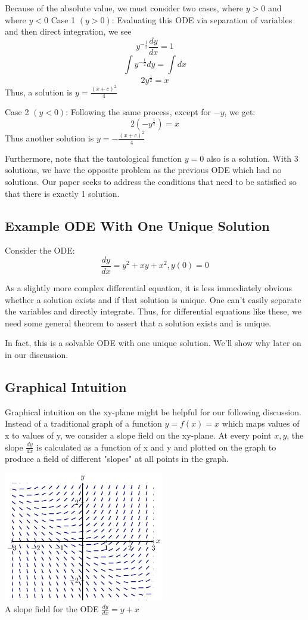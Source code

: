 \documentclass{article}
\begin{document}
Because of the absolute value, we must consider two cases, where $y>0$ and where $y<0$
Case 1 $(y>0)$:
Evaluating this ODE via separation of variables and then direct integration, we see
$$ y^{-\frac{1}{2}}\frac{dy}{dx} = 1$$
$$ \int y^{-\frac{1}{2}}dy = \int dx$$
$$ 2y^{\frac{1}{2}} = x$$
Thus, a solution is $y = \frac{(x+c)^2}{4}$

Case 2 $(y<0)$:
Following the same process, except for $-y$, we get:
$$ 2(-y^{\frac{1}{2}}) = x$$
Thus another solution is $y = -\frac{(x+c)^2}{4}$


Furthermore, note that the tautological function $y = 0$ also is a solution. With 3 solutions, we have the opposite problem as the previous ODE which had no solutions. Our paper seeks to address the conditions that need to be satisfied so that there is exactly 1 solution.

\subsection{Example ODE With One Unique Solution}
Consider the ODE:
$$\frac{dy}{dx} = y^2 + xy + x^2, y(0) = 0$$

As a slightly more complex differential equation, it is less immediately obvious whether a solution exists and if that solution is unique. One can't easily separate the variables and directly integrate. Thus, for differential equations like these, we need some general theorem to assert that a solution exists and is unique.

In fact, this is a solvable ODE with one unique solution. We'll show why later on in our discussion.


\subsection{Graphical Intuition}
Graphical intuition on the xy-plane might be helpful for our following discussion. Instead of a traditional graph of a function $y = f(x) = x$ which maps values of x to values of y, we consider a slope field on the xy-plane. At every point $x,y$, the slope $\frac{dy}{dx}$ is calculated as a function of x and y and plotted on the graph to produce a field of different "slopes" at all points in the graph. 

\begin{center}\includegraphics[width=7cm]{SlopeFieldMath.jpg} \\ A slope field for the ODE $\frac{dy}{dx} = y + x$\end{center}
\end{document}
